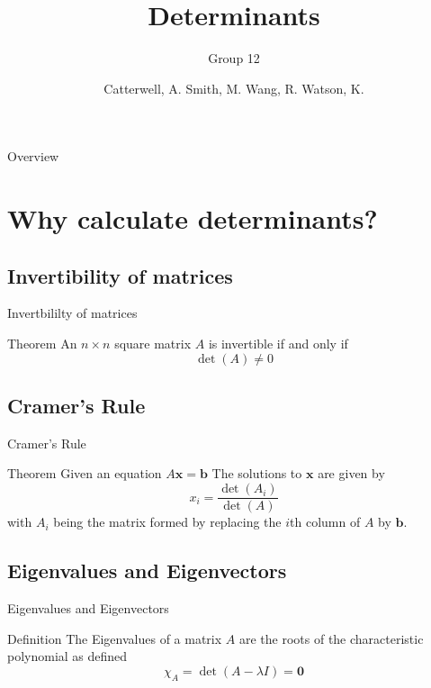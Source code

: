 \documentclass{beamer}
\title{Determinants}
\subtitle{Group 12}
\author{Catterwell, A. \quad Smith, M. \quad Wang, R. \quad Watson, K.}
\institute{University of Edinburgh}
\begin{document}
\begin{frame}
    \maketitle
\end{frame}

\begin{frame}{Overview}
    \tableofcontents
\end{frame}

\section{Why calculate determinants?}

\subsection{Invertibility of matrices}
\begin{frame}{Invertbililty of matrices}
    \begin{block}{Theorem}
        An $n \times n$ square matrix $A$ is invertible if and only if
        \[
            \det(A) \neq 0
        \]
    \end{block}

\end{frame}

\subsection{Cramer's Rule}

\begin{frame}{Cramer's Rule}
    \begin{block}{Theorem}
        Given an equation $A\mathbf{x} = \mathbf{b}$
        The solutions to $\mathbf{x}$ are given by
        \[
            x_i = \frac{\det(A_i)}{\det(A)}
        \]
        with $A_i$ being the matrix formed by replacing the $i$th column
        of $A$ by $\mathbf{b}$.
    \end{block}

\end{frame}

\subsection{Eigenvalues and Eigenvectors}

\begin{frame}{Eigenvalues and Eigenvectors}
    \begin{block}{Definition}
        The Eigenvalues of a matrix $A$ are the roots of the characteristic polynomial as defined
        \[
            \chi_A = \det(A - \lambda I) = \textbf{0}
        \]
    \end{block}
\end{frame}
\end{document}
